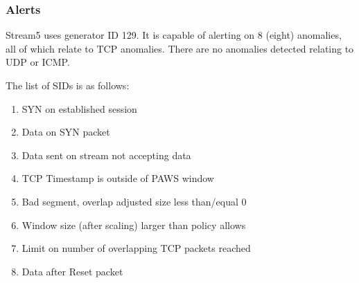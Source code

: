 \documentclass[english]{report}
\newenvironment{note}{
\samepage
    \vspace{10pt}{\textsf{
        {\hspace{7pt}\Huge{$\triangle$\hspace{-12.5pt}{\Large{$^!$}}}}\hspace{5pt}
        {\Large{NOTE}}
    }
    }
   \begin{center}
    \par\vspace{-17pt}

    \begin{lrbox}{\savepar}
    \begin{minipage}[r]{6in}
}
{
    \end{minipage}
    \end{lrbox}
    \fbox{
        \usebox{
            \savepar
	}
    }
    \par\vskip10pt
    \end{center}
}
\begin{document}
\subsubsection{Alerts}
Stream5 uses generator ID 129.  It is capable of alerting on 8 (eight)
anomalies, all of which relate to TCP anomalies.  There are no
anomalies detected relating to UDP or ICMP.

The list of SIDs is as follows:
\begin{enumerate}
\item{SYN on established session}
\item{Data on SYN packet}
\item{Data sent on stream not accepting data}
\item{TCP Timestamp is outside of PAWS window}
\item{Bad segment, overlap adjusted size less than/equal 0}
\item{Window size (after scaling) larger than policy allows}
\item{Limit on number of overlapping TCP packets reached}
\item{Data after Reset packet}
\end{enumerate}


\end{document}
